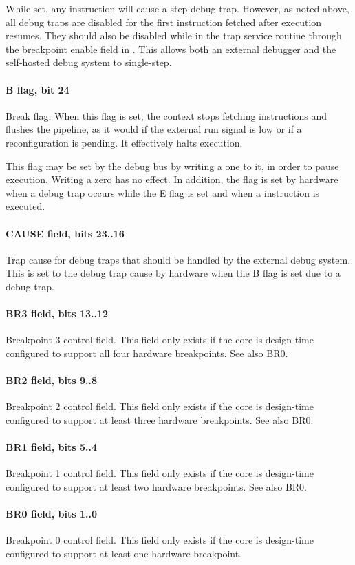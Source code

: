 While set, any instruction will cause a step debug trap. However, as noted
above, all debug traps are disabled for the first instruction fetched after
execution resumes. They should also be disabled while in the trap service
routine through the breakpoint enable field in . This allows both an
external debugger and the self-hosted debug system to single-step.
\paragraph*{B flag, bit 24}
Break flag. When this flag is set, the context stops fetching instructions and
flushes the pipeline, as it would if the external run signal is low or if a
reconfiguration is pending. It effectively halts execution.

This flag may be set by the debug bus by writing a one to it, in order to pause
execution. Writing a zero has no effect. In addition, the flag is set by
hardware when a debug trap occurs while the E flag is set and when a 
instruction is executed.
\paragraph*{CAUSE field, bits 23..16}
Trap cause for debug traps that should be handled by the external debug system.
This is set to the debug trap cause by hardware when the B flag is set due to a
debug trap.
\paragraph*{BR3 field, bits 13..12}
Breakpoint 3 control field. This field only exists if the core is design-time
configured to support all four hardware breakpoints. See also BR0.
\paragraph*{BR2 field, bits 9..8}
Breakpoint 2 control field. This field only exists if the core is design-time
configured to support at least three hardware breakpoints. See also BR0.
\paragraph*{BR1 field, bits 5..4}
Breakpoint 1 control field. This field only exists if the core is design-time
configured to support at least two hardware breakpoints. See also BR0.
\paragraph*{BR0 field, bits 1..0}
Breakpoint 0 control field. This field only exists if the core is design-time
configured to support at least one hardware breakpoint.


